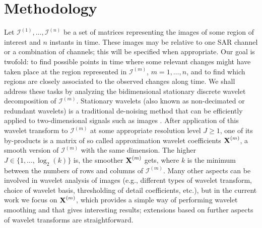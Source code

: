 \documentclass[journal]{IEEEtran}
\newcommand{\vX}{{\textbf X}}
\begin{document}
\section{Methodology}\label{section_method}

Let $\mathcal{I}^{(1)},\ldots,\mathcal{I}^{(n)}$ be a set of matrices representing the images of some region of interest and $n$ instants in time. These images may be relative to one SAR channel or a combination of channels; this will be specified when appropriate. Our goal is twofold: to find possible points in time where some relevant changes might have taken place at the region represented in $\mathcal{I}^{(m)}$, $m=1,\ldots,n$, and to find which regions are closely associated to the observed changes along time. We shall address these tasks by analyzing the bidimensional stationary discrete wavelet decomposition of $\mathcal{I}^{(m)}$. Stationary wavelets (also known as non-decimated or redundant wavelets) is a traditional de-noising method that can be efficiently applied to two-dimensional signals such as images \cite{coifman1995translation,atto2012multidate,atto2016wavelet}. After application of this wavelet transform to $\mathcal{I}^{(m)}$ at some appropriate resolution level $J\geq 1$, one of its by-products is a matrix of so called approximation wavelet coefficients $\vX^{(m)}$, a smooth version of $\mathcal{I}^{(m)}$ with the same dimension. The higher $J\in\{1,\ldots,\log_2(k)\}$ is, the smoother $\vX^{(m)}$ gets, where $k$ is the minimum between the numbers of rows and columns of $\mathcal{I}^{(m)}$. Many other aspects can be involved in wavelet analysis of images (e.g., different types of wavelet transform, choice of wavelet basis, thresholding of detail coefficients, etc.), but in the current work we focus on $\vX^{(m)}$, which provides a simple way of performing wavelet smoothing and that gives interesting results; extensions based on further aspects of wavelet transforms are straightforward.
\end{document}
